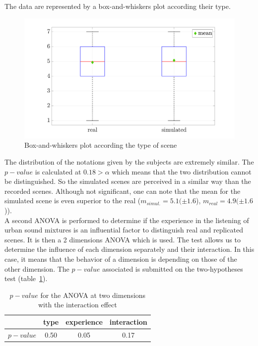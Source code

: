 \documentclass[a4,11pt,twocolumn]{article}
\begin{document}
The data are represented by a box-and-whiskers plot according their type.
\begin{figure}[hbtp]
\centering
\includegraphics[width=\linewidth]{./pictures/testPerceptif_boxplotType_EN.pdf}
\caption{Box-and-whiskers plot according the type of scene}
\label{fig:boxplot_real_simul}
\end{figure}

The distribution of the notations given by the subjects are extremely similar. The $p-value$ is calculated at $0.18 > \alpha$ which means that the two distribution cannot be distinguished. So the simulated scenes are perceived in a similar way than the recorded scenes. Although not significant, one can note that the mean for the simulated scene is even superior to the real ($m_{simul.} = 5.1 (\pm 1.6$), $ m_{real} = 4.9 (\pm 1.6$)). \\

A second ANOVA is performed to determine if the experience in the listening of urban sound mixtures is an influential factor to distinguish real and replicated scenes. It is then a 2 dimensions ANOVA which is used. The test allows us to determine  the influence of each dimension separately and their interaction. In this case, it means that the behavior of a dimension is depending on those of the other dimension. The $p-value$ associated is submitted on the two-hypotheses test (table~\ref{tab:p_value_type_exp}).\\

\begin{table}[h]
\centering
\begin{tabular}{cccc}
\cline{2-4}
          & type & experience & interaction \\
\hline
$p-value$ & 0.50 & 0.05 & 0.17 \\
\hline
\end{tabular}
\caption{$p-value$ for the ANOVA at two dimensions with the interaction effect}
\label{tab:p_value_type_exp}
\end{table}
\end{document}
